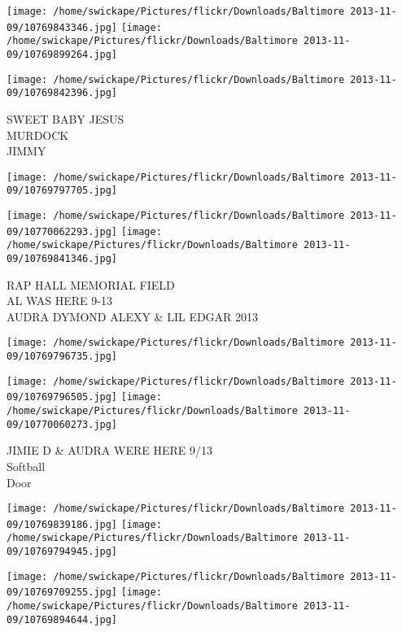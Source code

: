 \documentclass[10pt,letterpaper]{article}
\begin{document}
\texttt{[image: /home/swickape/Pictures/flickr/Downloads/Baltimore 2013-11-09/10769843346.jpg]}
\texttt{[image: /home/swickape/Pictures/flickr/Downloads/Baltimore 2013-11-09/10769899264.jpg]}

\vspace{0.25in}
\texttt{[image: /home/swickape/Pictures/flickr/Downloads/Baltimore 2013-11-09/10769842396.jpg]}

SWEET BABY JESUS\\
MURDOCK\\
JIMMY\\
\pagebreak

\texttt{[image: /home/swickape/Pictures/flickr/Downloads/Baltimore 2013-11-09/10769797705.jpg]}

\vspace{0.25in}
\texttt{[image: /home/swickape/Pictures/flickr/Downloads/Baltimore 2013-11-09/10770062293.jpg]}
\texttt{[image: /home/swickape/Pictures/flickr/Downloads/Baltimore 2013-11-09/10769841346.jpg]}

RAP HALL MEMORIAL FIELD\\
AL WAS HERE 9{-}13\\
AUDRA DYMOND ALEXY \& LIL EDGAR 2013\\
\pagebreak

\texttt{[image: /home/swickape/Pictures/flickr/Downloads/Baltimore 2013-11-09/10769796735.jpg]}

\vspace{0.25in}
\texttt{[image: /home/swickape/Pictures/flickr/Downloads/Baltimore 2013-11-09/10769796505.jpg]}
\texttt{[image: /home/swickape/Pictures/flickr/Downloads/Baltimore 2013-11-09/10770060273.jpg]}

JIMIE D \& AUDRA WERE HERE 9/13\\
Softball\\
Door\\
\pagebreak

\texttt{[image: /home/swickape/Pictures/flickr/Downloads/Baltimore 2013-11-09/10769839186.jpg]}
\texttt{[image: /home/swickape/Pictures/flickr/Downloads/Baltimore 2013-11-09/10769794945.jpg]}

\texttt{[image: /home/swickape/Pictures/flickr/Downloads/Baltimore 2013-11-09/10769709255.jpg]}
\texttt{[image: /home/swickape/Pictures/flickr/Downloads/Baltimore 2013-11-09/10769894644.jpg]}
\end{document}
